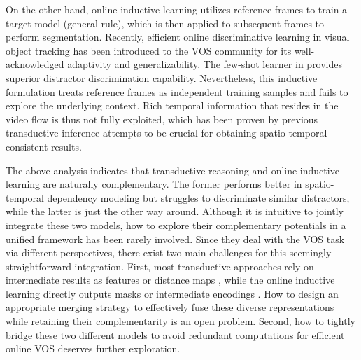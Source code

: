 \documentclass[10pt,twocolumn,letterpaper]{article}
\begin{document}
On the other hand, online inductive learning utilizes reference frames to train a target model (general rule), which is then applied to subsequent frames to perform segmentation.
Recently, efficient online discriminative learning \cite{dimp2019A,atom2019A} in visual object tracking has been introduced to the VOS community for its well-acknowledged adaptivity and generalizability. The few-shot learner in \cite{Goutam2020A,frtm2020A} provides superior distractor discrimination capability. 
Nevertheless, this inductive formulation treats reference frames as independent training samples and fails to explore the underlying context. Rich temporal information that resides in the video flow is thus not fully exploited, which has been proven by previous transductive inference attempts \cite{Seoung2019A,Zhang2020A} to be crucial for obtaining spatio-temporal consistent results.

The above analysis indicates that transductive reasoning and online inductive learning are naturally complementary. The former performs better in spatio-temporal dependency modeling but struggles to discriminate similar distractors, while the latter is just the other way around. Although it is intuitive to jointly integrate these two models, how to explore their complementary potentials in a unified framework has been rarely involved. Since they deal with the VOS task via different perspectives, there exist two main challenges for this seemingly straightforward integration. First, most transductive approaches rely on intermediate results as features \cite{Seoung2019A,Seong2020A,li2020A,lu2020A} or distance maps \cite{feelvos2019A,CFBI2020A}, while the online inductive learning directly outputs masks \cite{META2019A,frtm2020A} or intermediate encodings \cite{Goutam2020A}. How to design an appropriate merging strategy to effectively fuse these diverse representations while retaining their complementarity is an open problem.
Second, how to tightly bridge these two different models to avoid redundant computations for efficient online VOS deserves further exploration.
\end{document}
